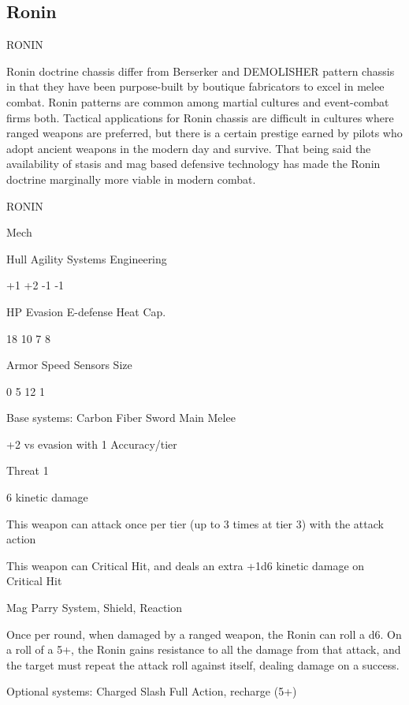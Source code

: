\subsection{Ronin}

                                                  RONIN

Ronin doctrine chassis differ from Berserker and DEMOLISHER pattern chassis in that they have
been purpose-built by boutique fabricators to excel in melee combat. Ronin patterns are
common among martial cultures and event-combat firms both. Tactical applications for Ronin
chassis are difficult in cultures where ranged weapons are preferred, but there is a certain
prestige earned by pilots who adopt ancient weapons in the modern day and survive. That being
said the availability of stasis and mag based defensive technology has made the Ronin doctrine
marginally more viable in modern combat.


 RONIN

 Mech

 Hull       Agility      Systems       Engineering

 +1         +2           -1            -1

 HP         Evasion      E-defense     Heat Cap.

 18         10           7             8

 Armor      Speed        Sensors       Size

 0          5            12            1

Base systems:
Carbon Fiber Sword
Main Melee

+2 vs evasion with 1 Accuracy/tier

Threat 1

6 kinetic damage

This weapon can attack once per tier (up to 3 times at tier 3) with the attack action

This weapon can Critical Hit, and deals an extra +1d6 kinetic damage on Critical Hit


Mag Parry
System, Shield, Reaction

Once per round, when damaged by a ranged weapon, the Ronin can roll a d6. On a roll of a 5+,
the Ronin gains resistance to all the damage from that attack, and the target must repeat the
attack roll against itself, dealing damage on a success.


Optional systems:
Charged Slash
Full Action, recharge (5+)





